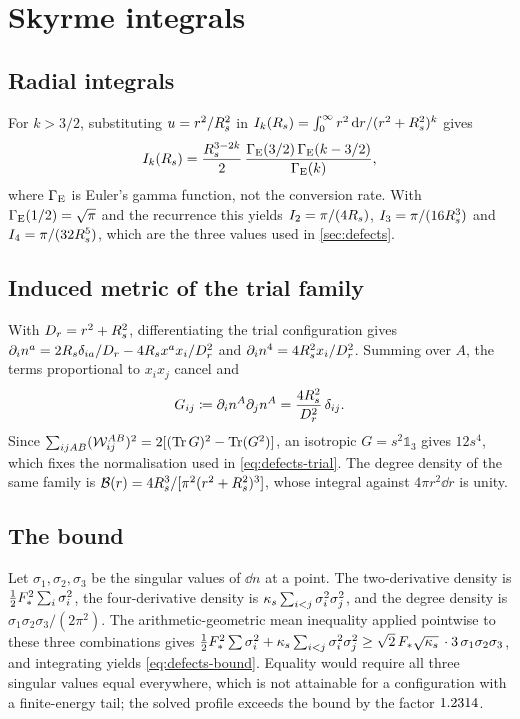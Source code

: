 \section{Skyrme integrals}\label{app:skyrme}

\subsection{Radial integrals}\label{app:skyrme-integrals}

For $k>3/2$, substituting $u=r^2/R_{s}^2$ in
$I_k(R_{s})=\int_0^\infty r^2\,\mathrm{d} r/(r^2+R_{s}^2)^k$ gives
%
\begin{equation}\label{eq:appe-radial}
  I_k(R_{s})=\frac{R_{s}^{3-2k}}{2}\,
  \frac{\Gamma_{\rm E}(3/2)\,\Gamma_{\rm E}(k-3/2)}{\Gamma_{\rm E}(k)} ,
\end{equation}
%
where $\Gamma_{\rm E}$ is Euler's gamma function, not the conversion rate. With
$\Gamma_{\rm E}(1/2)=\sqrt\pi$ and the recurrence this yields
$I_2=\pi/(4R_{s})$, $I_3=\pi/(16R_{s}^3)$ and $I_4=\pi/(32R_{s}^5)$, which are the
three values used in \cref{sec:defects}.

\subsection{Induced metric of the trial family}\label{app:skyrme-metric}

With $D_r=r^2+R_{s}^2$, differentiating the trial configuration gives
$\partial_i n^a=2R_{s}\delta_{ia}/D_r-4R_{s} x^ax_i/D_r^2$ and
$\partial_i n^4=4R_{s}^2x_i/D_r^2$. Summing over $A$, the terms proportional to
$x_ix_j$ cancel and
%
\begin{equation}\label{eq:appe-induced}
  G_{ij}\coloneqq\partial_i n^A\partial_j n^A=\frac{4R_{s}^2}{D_r^2}\,\delta_{ij} .
\end{equation}
%
Since
$\sum_{ijAB}(\mathcal W_{ij}^{AB})^2=2[(\operatorname{Tr} G)^2-\operatorname{Tr}(G^2)]$, an isotropic
$G=s^2\mathbb 1_3$ gives $12 s^4$, which fixes the normalisation used in
\cref{eq:defects-trial}. The degree density of the same family is
$\mathcal B(r)=4R_{s}^3/[\pi^2(r^2+R_{s}^2)^3]$, whose integral against
$4\pi r^2\dd r$ is unity.

\subsection{The bound}\label{app:skyrme-bound}

Let $\sigma_1,\sigma_2,\sigma_3$ be the singular values of $\dd n$ at a point.
The two-derivative density is $\tfrac12F_{*}^2\sum_i\sigma_i^2$, the
four-derivative density is
$\kappa_{s}\sum_{i<j}\sigma_i^2\sigma_j^2$, and the degree density is
$\sigma_1\sigma_2\sigma_3/(2\pi^2)$. The arithmetic-geometric mean inequality
applied pointwise to these three combinations gives
$\tfrac12F_{*}^2\sum\sigma_i^2+\kappa_{s}\sum_{i<j}\sigma_i^2\sigma_j^2
\ge\sqrt2\,F_{*}\sqrt{\kappa_{s}}\,\cdot 3\,\sigma_1\sigma_2\sigma_3$,
and integrating yields \cref{eq:defects-bound}. Equality would require all
three singular values equal everywhere, which is not attainable for a
configuration with a finite-energy tail; the solved profile exceeds the bound
by the factor $1.2314$.
